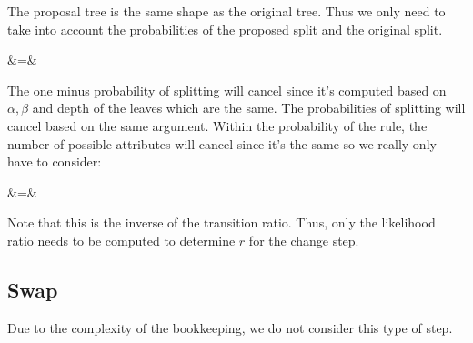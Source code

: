 The proposal tree is the same shape as the original tree. Thus we only need to take into account the probabilities of the proposed split and the original split.

\beqn
{} &=& 
\eeqn

The one minus probability of splitting will cancel since it's computed based on $\alpha, \beta$ and depth of the leaves which are the same. The probabilities of splitting will cancel based on the same argument. Within the probability of the rule, the number of possible attributes will cancel since it's the same so we really only have to consider:

\beqn
{} &=& \frac{\nadj}{\nadjstar}
\eeqn

Note that this is the inverse of the transition ratio. Thus, only the likelihood ratio needs to be computed to determine $r$ for the change step.

\subsection*{Swap}

Due to the complexity of the bookkeeping, we do not consider this type of step.





